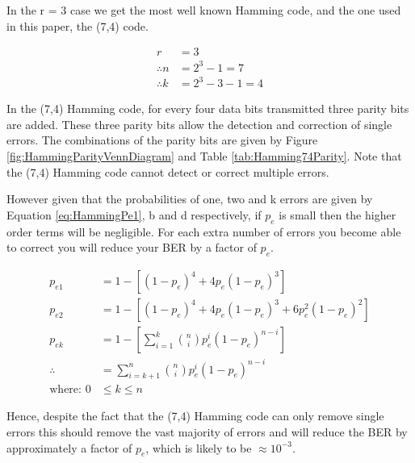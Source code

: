 \documentclass[12pt,onecolumn,letterpaper]{article}
\begin{document}
In the r = 3 case we get the most well known Hamming code, and the one used in this paper, the (7,4) code.

\begin{align}
   r &= 3 \\
   \therefore n &= 2^3 - 1 = 7 \\
   \therefore k &= 2^3 -3 -1 = 4
   \label{eq:Hamming74Characteristics}
\end{align}

In the (7,4) Hamming code, for every four data bits transmitted three parity bits are added. These three parity bits allow the detection and correction of single errors. The combinations of the parity bits are given by Figure \ref{fig:HammingParityVennDiagram} and Table \ref{tab:Hamming74Parity}. Note that the (7,4) Hamming code cannot detect or correct multiple errors. 

However given that the probabilities of one, two and k errors are given by Equation \ref{eq:HammingPe1}, b and d respectively, if $p_e$ is small then the higher order terms will be negligible. For each extra number of errors you become able to correct you will reduce your BER by a factor of $p_e$.

\begin{subequations}
\begin{align}
   p_{e1} &= 1 - \left[(1-p_e)^{4} + 4p_e(1-p_e)^{3} \right] \label{eq:HammingPe1} \\
   p_{e2} &= 1 - \left[ (1-p_e)^{4} + 4p_e(1-p_e)^{3} + 6p_e^2(1-p_e)^{2} \right] \label{eq:HammingPe2} \\
   p_{ek} &= 1 - \left[ \sum_{i=1}^{k}{n \choose i}p_e^i(1-p_e)^{n-i} \right] \\
   \therefore &= \sum_{i=k+1}^{n}{n \choose i}p_e^i(1-p_e)^{n-i}  
   \label{eq:HammingPeN} \\
   \mbox{where: }0 &\leq k \leq n 
\end{align}
\end{subequations}

Hence, despite the fact that the (7,4) Hamming code can only remove single errors this should remove the vast majority of errors and will reduce the BER by approximately a factor of $p_e$, which is likely to be $\approx10^{-3}$.
\end{document}
